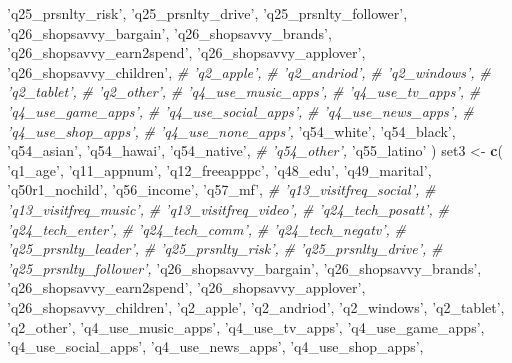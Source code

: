 \documentclass[]{article}
\newenvironment{Shaded}{\begin{snugshade}}{\end{snugshade}}
\newcommand{\KeywordTok}[1]{\textcolor[rgb]{0.13,0.29,0.53}{\textbf{#1}}}
\newcommand{\StringTok}[1]{\textcolor[rgb]{0.31,0.60,0.02}{#1}}
\newcommand{\CommentTok}[1]{\textcolor[rgb]{0.56,0.35,0.01}{\textit{#1}}}
\newcommand{\NormalTok}[1]{#1}
\begin{document}
\begin{Shaded}
\begin{Highlighting}[]
  \StringTok{'q25_prsnlty_risk'}\NormalTok{,}
  \StringTok{'q25_prsnlty_drive'}\NormalTok{,}
  \StringTok{'q25_prsnlty_follower'}\NormalTok{,}
  \StringTok{'q26_shopsavvy_bargain'}\NormalTok{,}
  \StringTok{'q26_shopsavvy_brands'}\NormalTok{,}
  \StringTok{'q26_shopsavvy_earn2spend'}\NormalTok{,}
  \StringTok{'q26_shopsavvy_applover'}\NormalTok{,}
  \StringTok{'q26_shopsavvy_children'}\NormalTok{,}
  \CommentTok{# 'q2_apple',}
  \CommentTok{# 'q2_andriod',}
  \CommentTok{# 'q2_windows',}
  \CommentTok{# 'q2_tablet',}
  \CommentTok{# 'q2_other',}
  \CommentTok{# 'q4_use_music_apps',}
  \CommentTok{# 'q4_use_tv_apps',}
  \CommentTok{# 'q4_use_game_apps',}
  \CommentTok{# 'q4_use_social_apps',}
  \CommentTok{# 'q4_use_news_apps',}
  \CommentTok{# 'q4_use_shop_apps',}
  \CommentTok{# 'q4_use_none_apps',}
  \StringTok{'q54_white'}\NormalTok{,}
  \StringTok{'q54_black'}\NormalTok{,}
  \StringTok{'q54_asian'}\NormalTok{,}
  \StringTok{'q54_hawai'}\NormalTok{,}
  \StringTok{'q54_native'}\NormalTok{,}
  \CommentTok{# 'q54_other',}
  \StringTok{'q55_latino'}
\NormalTok{  )}
\NormalTok{set3 <-}\StringTok{ }\KeywordTok{c}\NormalTok{(}
  \StringTok{'q1_age'}\NormalTok{,}
  \StringTok{'q11_appnum'}\NormalTok{,}
  \StringTok{'q12_freeapppc'}\NormalTok{,}
  \StringTok{'q48_edu'}\NormalTok{,}
  \StringTok{'q49_marital'}\NormalTok{,}
  \StringTok{'q50r1_nochild'}\NormalTok{,}
  \StringTok{'q56_income'}\NormalTok{,}
  \StringTok{'q57_mf'}\NormalTok{,}
  \CommentTok{# 'q13_visitfreq_social',}
  \CommentTok{# 'q13_visitfreq_music',}
  \CommentTok{# 'q13_visitfreq_video',}
  \CommentTok{# 'q24_tech_posatt',}
  \CommentTok{# 'q24_tech_enter',}
  \CommentTok{# 'q24_tech_comm',}
  \CommentTok{# 'q24_tech_negatv',}
  \CommentTok{# 'q25_prsnlty_leader',}
  \CommentTok{# 'q25_prsnlty_risk',}
  \CommentTok{# 'q25_prsnlty_drive',}
  \CommentTok{# 'q25_prsnlty_follower',}
  \StringTok{'q26_shopsavvy_bargain'}\NormalTok{,}
  \StringTok{'q26_shopsavvy_brands'}\NormalTok{,}
  \StringTok{'q26_shopsavvy_earn2spend'}\NormalTok{,}
  \StringTok{'q26_shopsavvy_applover'}\NormalTok{,}
  \StringTok{'q26_shopsavvy_children'}\NormalTok{,}
  \StringTok{'q2_apple'}\NormalTok{,}
  \StringTok{'q2_andriod'}\NormalTok{,}
  \StringTok{'q2_windows'}\NormalTok{,}
  \StringTok{'q2_tablet'}\NormalTok{,}
  \StringTok{'q2_other'}\NormalTok{,}
  \StringTok{'q4_use_music_apps'}\NormalTok{,}
  \StringTok{'q4_use_tv_apps'}\NormalTok{,}
  \StringTok{'q4_use_game_apps'}\NormalTok{,}
  \StringTok{'q4_use_social_apps'}\NormalTok{,}
  \StringTok{'q4_use_news_apps'}\NormalTok{,}
  \StringTok{'q4_use_shop_apps'}\NormalTok{,}

\end{Highlighting}
\end{Shaded}
\end{document}
